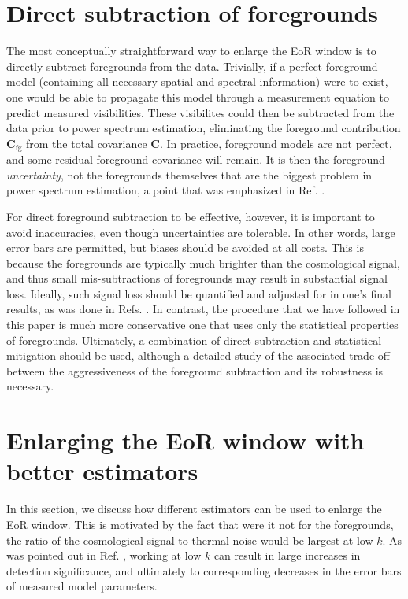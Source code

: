 \documentclass[twocolumn,aps,prd,nofootinbib,showpacs]{revtex4-1}
\begin{document}
\section{Direct subtraction of foregrounds}
\label{sec:Direct}
The most conceptually straightforward way to enlarge the EoR window is to directly subtract foregrounds from the data.  Trivially, if a perfect foreground model (containing all necessary spatial and spectral information) were to exist, one would be able to propagate this model through a measurement equation to predict measured visibilities.  These visibilites could then be subtracted from the data prior to power spectrum estimation, eliminating the foreground contribution $\mathbf{C}_\textrm{fg}$ from the total covariance $\mathbf{C}$.  In practice, foreground models are not perfect, and some residual foreground covariance will remain.  It is then the foreground \emph{uncertainty}, not the foregrounds themselves that are the biggest problem in power spectrum estimation, a point that was emphasized in Ref. \cite{Trott2012}.

For direct foreground subtraction to be effective, however, it is important to avoid inaccuracies, even though uncertainties are tolerable.  In other words, large error bars are permitted, but biases should be avoided at all costs.  This is because the foregrounds are typically much brighter than the cosmological signal, and thus small mis-subtractions of foregrounds may result in substantial signal loss.  Ideally, such signal loss should be quantified and adjusted for in one's final results, as was done in Refs. \cite{Masui2013,Paciga2013,Switzer2013}.  In contrast, the procedure that we have followed in this paper is much more conservative one that uses only the statistical properties of foregrounds.  Ultimately, a combination of direct subtraction and statistical mitigation should be used, although a detailed study of the associated trade-off between the aggressiveness of the foreground subtraction and its robustness is necessary.

\section{Enlarging the EoR window with better estimators}
\label{sec:Enlarging}
In this section, we discuss how different estimators can be used to enlarge the EoR window.  This is motivated by the fact that were it not for the foregrounds, the ratio of the cosmological signal to thermal noise would be largest at low $k$.  As was pointed out in Ref. \cite{Pober2014}, working at low $k$ can result in large increases in detection significance, and ultimately to corresponding decreases in the error bars of measured model parameters.
\end{document}

